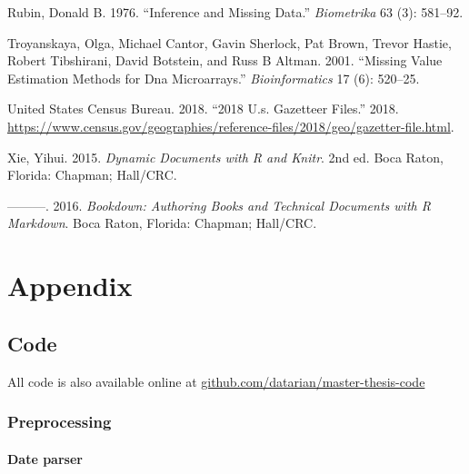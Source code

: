 \documentclass[
  11pt,
  a4paper,
  DIV=12,captions=tableheading,oneside]{scrbook}
\begin{document}
\leavevmode\hypertarget{ref-rubin1976inference}{}%
Rubin, Donald B. 1976. ``Inference and Missing Data.'' \emph{Biometrika} 63 (3): 581--92.

\leavevmode\hypertarget{ref-troyanskaya2001missing}{}%
Troyanskaya, Olga, Michael Cantor, Gavin Sherlock, Pat Brown, Trevor Hastie, Robert Tibshirani, David Botstein, and Russ B Altman. 2001. ``Missing Value Estimation Methods for Dna Microarrays.'' \emph{Bioinformatics} 17 (6): 520--25.

\leavevmode\hypertarget{ref-census-gazet}{}%
United States Census Bureau. 2018. ``2018 U.s. Gazetteer Files.'' 2018. \url{https://www.census.gov/geographies/reference-files/2018/geo/gazetter-file.html}.

\leavevmode\hypertarget{ref-xie2015}{}%
Xie, Yihui. 2015. \emph{Dynamic Documents with R and Knitr}. 2nd ed. Boca Raton, Florida: Chapman; Hall/CRC.

\leavevmode\hypertarget{ref-xie2016bookdown}{}%
---------. 2016. \emph{Bookdown: Authoring Books and Technical Documents with R Markdown}. Boca Raton, Florida: Chapman; Hall/CRC.

\hypertarget{appendix}{%
\chapter*{Appendix}\label{appendix}}

\hypertarget{code}{%
\section{Code}\label{code}}

All code is also available online at \href{https://github.com/datarian/master-thesis-code}{github.com/datarian/master-thesis-code}

\hypertarget{preprocessing-1}{%
\subsection{Preprocessing}\label{preprocessing-1}}

\hypertarget{code-dateparser}{%
\subsubsection{Date parser}\label{code-dateparser}}
\end{document}
